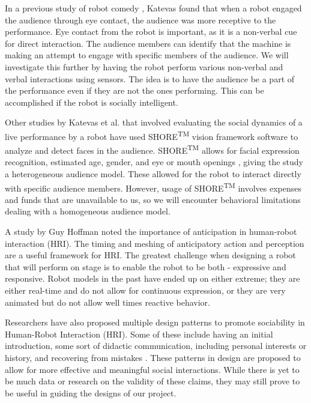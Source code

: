 \documentclass[onecolumn, draftclsnofoot,10pt, compsoc]{IEEEtran}
\begin{document}
In a previous study of robot comedy \cite{RobotComedyLab:2015}, Katevas found that when a robot engaged the audience through eye contact, the audience was more receptive to the performance. Eye contact from the robot is important, as it is a non-verbal cue for direct interaction. The audience members can identify that the machine is making an attempt to engage with specific members of the audience. We will investigate this further by having the robot perform various non-verbal and verbal interactions using sensors. The idea is to have the audience be a part of the performance even if they are not the ones performing. This can be accomplished if the robot is socially intelligent.

Other studies by Katevas et al. \cite{KatevasRobot:2014} that involved evaluating the social dynamics of a live performance by a robot have used SHORE\textsuperscript{TM} vision framework software to analyze and detect faces in the audience. SHORE\textsuperscript{TM} allows for facial expression recognition, estimated age, gender, and eye or mouth openings \cite{SHORE}, giving the study a heterogeneous audience model. These allowed for the robot to interact directly with specific audience members. However, usage of SHORE\textsuperscript{TM} involves expenses and funds that are unavailable to us, so we will encounter behavioral limitations dealing with a homogeneous audience model.

A study by Guy Hoffman {\cite{hoffman2010anticipation}} noted the importance of anticipation in human-robot interaction (HRI). The timing and meshing of anticipatory action and perception are a useful framework for HRI. The greatest challenge when designing a robot that will perform on stage is to enable the robot to be both - expressive and responsive. Robot models in the past have ended up on either extreme; they are either real-time and do not allow for continuous expression, or they are very animated but do not allow well times reactive behavior.


Researchers have also proposed multiple design patterns to promote sociability in Human-Robot Interaction (HRI). Some of these include having an initial introduction, some sort of didactic communication, including personal interests or history, and recovering from mistakes \cite{Kahn:2008}. These patterns in design are proposed to allow for more effective and meaningful social interactions. While there is yet to be much data or research on the validity of these claims, they may still prove to be useful in guiding the designs of our project.
\end{document}

